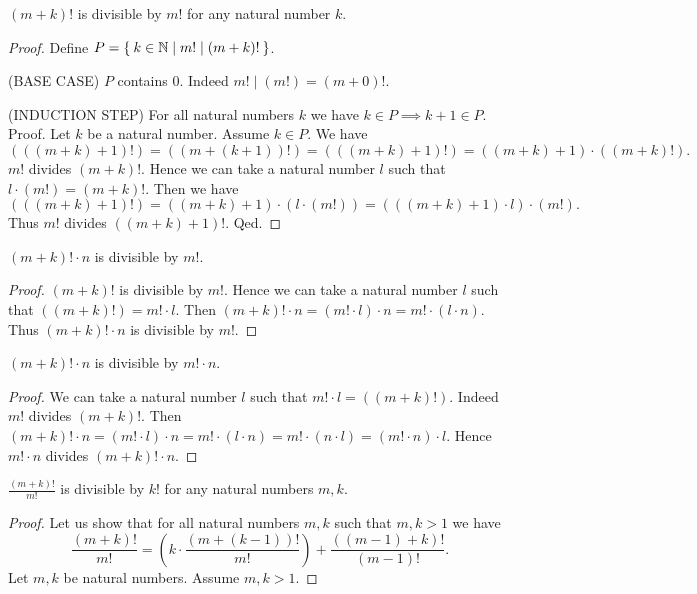 \documentclass[../../arithmetic.ftl.tex]{subfiles}
\begin{document}
\begin{forthel}
    \begin{proposition}\label{Arithmetic_03_05_805525}
      $(m + k)!$ is divisible by $m!$ for any natural number $k$.
    \end{proposition}
    \begin{proof}
      Define $P = \Set{k \in \mathbb{N} | m! \mid (m + k)!}$.

      (BASE CASE) $P$ contains $0$.
      Indeed $m! \mid (m!) = (m + 0)!$.

      (INDUCTION STEP) For all natural numbers $k$ we have $k \in P \implies k + 1 \in P$. \\
      Proof.
        Let $k$ be a natural number.
        Assume $k \in P$.
        We have
        \[  (((m + k) + 1)!)
            = ((m + (k + 1))!)
            = (((m + k) + 1)!)
            = ((m + k) + 1) \cdot ((m + k)!). \]
        $m!$ divides $(m + k)!$.
        Hence we can take a natural number $l$ such that $l \cdot (m!) = (m + k)!$.
        Then we have
        \[  (((m + k) + 1)!)
            = ((m + k) + 1) \cdot (l \cdot (m!))
            = (((m + k) + 1) \cdot l) \cdot (m!). \]
        Thus $m!$ divides $((m + k) + 1)!$.
      Qed.
    \end{proof}

    \begin{corollary}
      $(m + k)! \cdot n$ is divisible by $m!$.
    \end{corollary}
    \begin{proof}
      $(m + k)!$ is divisible by $m!$.
      Hence we can take a natural number $l$ such that $((m + k)!) = m! \cdot l$.
      Then $(m + k)! \cdot n = (m! \cdot l) \cdot n = m! \cdot (l \cdot n)$.
      Thus $(m + k)! \cdot n$ is divisible by $m!$.
    \end{proof}

    \begin{corollary}
      $(m + k)! \cdot n$ is divisible by $m! \cdot n$.
    \end{corollary}
    \begin{proof}
      We can take a natural number $l$ such that $m! \cdot l = ((m + k)!)$.
      Indeed $m!$ divides $(m + k)!$.
      Then $(m + k)! \cdot n = (m! \cdot l) \cdot n = m! \cdot (l \cdot n) = m! \cdot (n \cdot l) = (m! \cdot n) \cdot l$.
      Hence $m! \cdot n$ divides $(m + k)! \cdot n$.
    \end{proof}

    \begin{proposition}\label{Arithmetic_03_05_335719}
      $\frac{(m + k)!}{m!}$ is divisible by $k!$ for any natural numbers $m,k$.
    \end{proposition}
    \begin{proof}
      Let us show that for all natural numbers $m,k$ such that $m,k > 1$ we have
      \[ \frac{(m + k)!}{m!} = (k \cdot \frac{(m + (k - 1))!}{m!}) + \frac{((m - 1) + k)!}{(m - 1)!}. \]
        Let $m,k$ be natural numbers.
        Assume $m,k > 1$.


\end{proof}
\end{forthel}
\end{document}
